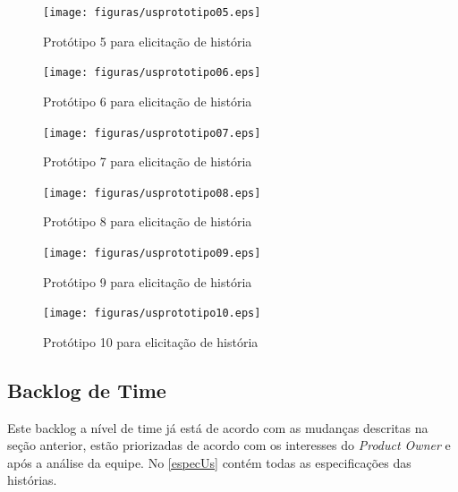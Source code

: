\begin{figure}[H]
    \centering
    \texttt{[image: figuras/usprototipo05.eps]}
    \caption[Protótipo 5 de história]{Protótipo 5 para elicitação de história\label{usprototipo05}}
\end{figure}

\begin{figure}[H]
    \centering
    \texttt{[image: figuras/usprototipo06.eps]}
    \caption[Protótipo 6 de história]{Protótipo 6 para elicitação de história\label{usprototipo06}}
\end{figure}

\begin{figure}[H]
    \centering
    \texttt{[image: figuras/usprototipo07.eps]}
    \caption[Protótipo 7 de história]{Protótipo 7 para elicitação de história\label{usprototipo07}}
\end{figure}

\begin{figure}[H]
    \centering
    \texttt{[image: figuras/usprototipo08.eps]}
    \caption[Protótipo 8 de história]{Protótipo 8 para elicitação de história\label{usprototipo08}}
\end{figure}

\begin{figure}[H]
    \centering
    \texttt{[image: figuras/usprototipo09.eps]}
    \caption[Protótipo 9 de história]{Protótipo 9 para elicitação de história\label{usprototipo09}}
\end{figure}

\begin{figure}[H]
    \centering
    \texttt{[image: figuras/usprototipo10.eps]}
    \caption[Protótipo 10 de história]{Protótipo 10 para elicitação de história\label{usprototipo10}}
\end{figure}

\subsection{Backlog de Time}

    Este backlog a nível de time já está de acordo com as mudanças descritas na seção anterior, estão priorizadas de acordo com os interesses do \textit{Product Owner} e após a análise da equipe. No \autoref{especUs} contém todas as especificações das histórias.

